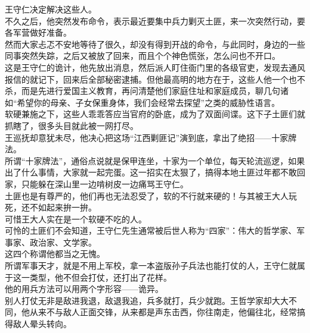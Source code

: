 \begin{multicols}{\theparacolNo}
王守仁决定解决这些人。\\

不久之后，他突然发布命令，表示最近要集中兵力剿灭土匪，来一次突然行动，要各军营做好准备。\\

然而大家忐忑不安地等待了很久，却没有得到开战的命令，与此同时，身边的一些同事突然失踪，之后又被放了回来，而且个个神色慌张，怎么问也不开口。\\

这是王守仁的诡计，他先放出消息，然后派人盯住衙门里的各级官吏，发现去通风报信的就记下，回来后全部秘密逮捕。但他最高明的地方在于，这些人他一个也不杀，而是先进行爱国主义教育，再问清楚他们家庭住址和家庭成员，聊几句诸如“希望你的母亲、子女保重身体，我们会经常去探望”之类的威胁性语言。\\

软硬兼施之下，这些人乖乖答应当官府的卧底，成为了双面间谍。这下子土匪们就抓瞎了，很多头目就此被一网打尽。\\

王巡抚却意犹未尽，他决心把这场“江西剿匪记”演到底，拿出了绝招——十家牌法。\\

所谓“十家牌法”，通俗点说就是保甲连坐，十家为一个单位，每天轮流巡逻，如果出了什么事情，大家就一起完蛋。这一招实在太狠了，搞得本地土匪过年都不敢回家，只能躲在深山里一边啃树皮一边痛骂王守仁。\\

土匪也是有尊严的，他们再也无法忍受了，软的不行就来硬的！与其被王大人玩死，还不如起来拚一拚。\\

可惜王大人实在是一个软硬不吃的人。\\

可怜的土匪们不会知道，王守仁先生通常被后世人称为“四家”：伟大的哲学家、军事家、政治家、文学家。\\

这四个称谓他都当之无愧。\\

所谓军事天才，就是不用上军校，拿一本盗版孙子兵法也能打仗的人，王守仁就属于这一类型，他不但会打仗，还打出了花样。\\

他的用兵方法可以用两个字形容——诡异。\\

别人打仗无非是敌进我退，敌退我追，兵多就打，兵少就跑。王哲学家却大大不同，他从来不与敌人正面交锋，从来都是声东击西，你往南走，他偏往北，经常搞得敌人晕头转向。\\


\end{multicols}

